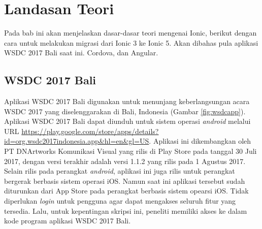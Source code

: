 \chapter{Landasan Teori}
\label{chap:teori}

Pada bab ini akan menjelaskan dasar-dasar teori mengenai Ionic, berikut dengan cara untuk melakukan migrasi dari Ionic 3 ke Ionic 5. Akan dibahas pula aplikasi WSDC 2017 Bali saat ini. Cordova, dan Angular.

\section{WSDC 2017 Bali}
\label{sec:wsdc2017bali}

Aplikasi WSDC 2017 Bali digunakan untuk menunjang keberlangsungan acara WSDC 2017 yang diselenggarakan di Bali, Indonesia (Gambar \ref{fig:wsdcapp}). Aplikasi WSDC 2017 Bali dapat diunduh untuk sistem operasi {\it android} melalui URL \url{https://play.google.com/store/apps/details?id=org.wsdc2017indonesia.app&hl=en&gl=US}. Aplikasi ini dikembangkan oleh PT DNArtworks Komunikasi Visual yang rilis di Play Store pada tanggal 30 Juli 2017, dengan versi terakhir adalah versi 1.1.2 yang rilis pada 1 Agustus 2017. Selain rilis pada perangkat {\it android}, aplikasi ini juga rilis untuk perangkat bergerak berbasis sistem operasi iOS. Namun saat ini aplikasi tersebut sudah diturunkan dari App Store pada perangkat berbasis sistem opearsi iOS. Tidak diperlukan {\it login} untuk pengguna agar dapat mengakses seluruh fitur yang tersedia. Lalu, untuk kepentingan skripsi ini, peneliti memiliki akses ke dalam kode program aplikasi WSDC 2017 Bali.

